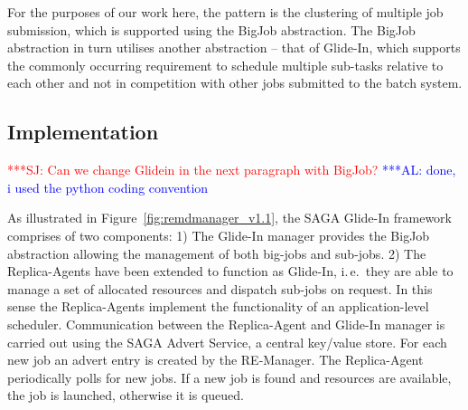 \documentclass{rspublic}
\newcommand{\alnote}[1]{ {\textcolor{blue} { ***AL: #1 }}}
\newcommand{\jhanote}[1]{ {\textcolor{red} { ***SJ: #1 }}}
\newcommand{\alnote}[1]{}
\newcommand{\jhanote}[1]{}
\newcommand{\replicaagent}[1]{Replica-Agent }
\begin{document}
For the purposes of our work here, the pattern is the clustering 
of multiple job submission, which is supported
using the BigJob abstraction. The BigJob abstraction in turn utilises
another abstraction -- that of Glide-In, which supports the commonly
occurring requirement to schedule multiple sub-tasks relative to each
other and not in competition with other jobs submitted to the
batch system.
                         





         
\subsection{Implementation}
\jhanote{Can we change Glidein in the next paragraph with BigJob?}
\alnote{done, i used the python coding convention}    
                   

As illustrated in Figure~\ref{fig:remdmanager_v1.1}, the SAGA Glide-In
framework comprises of two components: 1) The Glide-In manager
provides the BigJob abstraction allowing the management of both
big-jobs and sub-jobs.  2) The Replica-Agents have been extended
to function as Glide-In, i.\,e.\ they are able to manage a set of
allocated resources and dispatch sub-jobs on request. In this sense
the Replica-Agents implement the functionality of an application-level
scheduler. Communication between the Replica-Agent and Glide-In
manager is carried out using the SAGA Advert Service, a central
key/value store. For each new job an advert entry is created by the
RE-Manager. The \replicaagent\ periodically polls for new jobs.  If a
new job is found and resources are available, the job is launched,
otherwise it is queued.   
\end{document}
